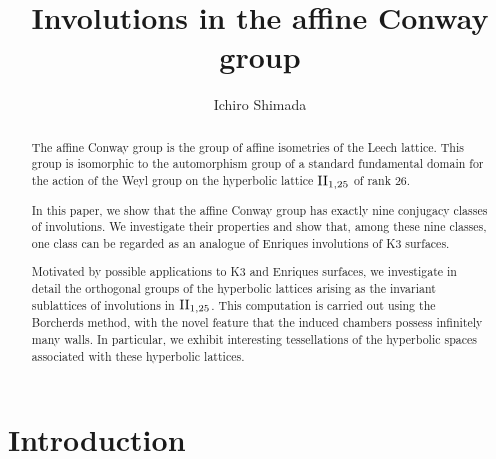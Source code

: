 \documentclass{amsart} %
\begin{document}
\title[Involutions in the affine Conway group]
{Involutions in the affine Conway group}

\author{Ichiro Shimada}
\address{Department of Mathematics,
Graduate School of Science,
Hiroshima University,
1-3-1 Kagamiyama,
Higashi-Hiroshima,
739-8526 JAPAN}
%



\begin{abstract}
The affine Conway group is the group of affine isometries of the Leech lattice.
This group is isomorphic to the automorphism group of 
a standard fundamental domain for the action of 
the Weyl group on the hyperbolic lattice $\mathrm{II}_{1, 25}$ of rank $26$.
 \par
In this paper, we show that the affine Conway group has exactly nine conjugacy classes of involutions.
We investigate their properties
and show that, 
among these nine classes, 
one class can be regarded as an analogue of Enriques involutions of K3 surfaces.
 \par
Motivated by possible applications to K3 and Enriques surfaces, 
we investigate in detail the orthogonal groups of the hyperbolic lattices 
arising as the invariant sublattices of involutions in $\mathrm{II}_{1, 25}$.
This computation is carried out using the Borcherds method, 
with the novel feature that the induced chambers possess infinitely many walls.
In particular, 
we exhibit interesting tessellations of the hyperbolic spaces associated 
with these hyperbolic lattices.
\end{abstract}
%
\keywords{}
\maketitle
%
%
% 
\section{Introduction}
%
\end{document}
